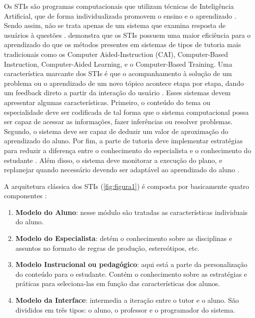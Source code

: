 \documentclass[
12pt,				%
oneside,			%
a4paper,			%
english,			%
brazil				%
]{abntex2ppgsi}
\begin{document}
Os STIs são programas computacionais que utilizam técnicas de Inteligência Artificial, que de forma individualizada promovem o ensino e o aprendizado \cite{wenger1987}. Sendo assim, não se trata apenas de um sistema que examina resposta de usuários à questões \cite{sleeman1982}.  demonstra que os STIs possuem uma maior eficiência para o aprendizado do que os métodos presentes em sistemas de tipos de tutoria mais tradicionais como os Computer Aided-Instruction (CAI), Computer-Based Instruction, Computer-Aided Learning, e o Computer-Based Training. Uma característica marcante dos STIs é que o acompanhamento à solução de um problema ou o aprendizado de um novo tópico acontece etapa por etapa, dando um feedback direto a partir da interação do usuário \cite{vanlehn2011}. Esses sistemas devem apresentar algumas características. Primeiro, o conteúdo do tema ou especialidade deve ser codificada de tal forma que o sistema computacional possa ser capaz de acessar as informações, fazer inferências ou resolver problemas. Segundo, o sistema deve ser capaz de deduzir um valor de aproximação do aprendizado do aluno. Por fim, a parte de tutoria deve implementar estratégias para reduzir a diferença entre o conhecimento do especialista e o conhecimento do estudante \cite{polson2013}. Além disso, o sistema deve monitorar a execução do plano, e replanejar quando necessário devendo ser adaptável ao aprendizado do aluno \cite{woo1991}.

A arquitetura clássica dos STIs (\ref{fig:figura1}) é composta por basicamente quatro componentes \cite{kaplan1995}:

\begin{enumerate}
	\item \textbf{Modelo do Aluno}: nesse módulo são tratadas as características individuais do aluno.
	\item \textbf{Modelo do Especialista}: detém o conhecimento sobre as disciplinas e assuntos no formato de regras de produção, estereótipos, etc.
	\item \textbf{Modelo Instrucional ou pedagógico}: aqui está a parte da personalização do conteúdo para o estudante. Contém o conhecimento sobre as estratégias e práticas para seleciona-las em função das características dos alunos.
	\item \textbf{Modelo da Interface}: intermedia a iteração entre o tutor e o aluno. São divididos em três tipos: o aluno, o professor e o programador do sistema.
\end{enumerate}
\end{document}
